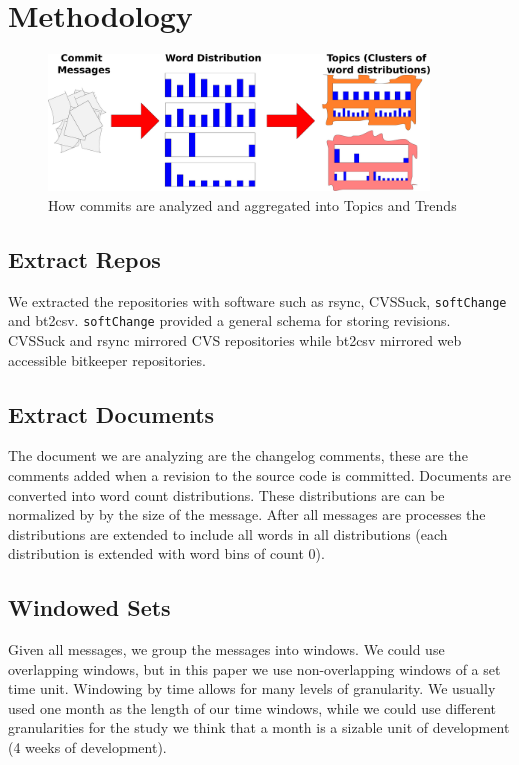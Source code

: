 \documentclass[times, 10pt,twocolumn]{article}
\begin{document}
\section{Methodology}
\begin{figure}
  \centering
  \includegraphics[width=0.9\textwidth]{commit-to-topics} 
  \caption{How commits are analyzed and aggregated into Topics and Trends}
  \label{fig:commits}
\end{figure}



\subsection{Extract Repos}

We extracted the repositories with software such as rsync, CVSSuck,
\texttt{softChange} and bt2csv.  \texttt{softChange} provided a
general schema for storing revisions. CVSSuck and rsync mirrored CVS
repositories while bt2csv mirrored web accessible bitkeeper
repositories.


\subsection{Extract Documents}

The document we are analyzing are the changelog comments, these are
the comments added when a revision to the source code is committed.
Documents are converted into word count distributions. These
distributions are can be normalized by by the size of the
message. After all messages are processes the distributions are
extended to include all words in all distributions (each distribution
is extended with word bins of count 0).

\subsection{Windowed Sets}

Given all messages, we group the messages into windows. We could use
overlapping windows, but in this paper we use non-overlapping windows
of a set time unit.  Windowing by time allows for many levels of
granularity. We usually used one month as the length of our time
windows, while we could use different granularities for the study we
think that a month is a sizable unit of development (4 weeks of
development).
\end{document}
